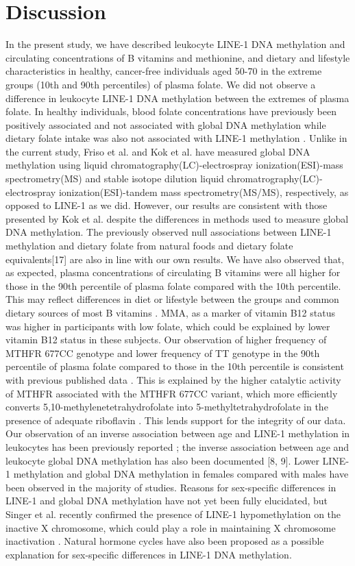 \section{Discussion} %
In the present study, we have described leukocyte LINE-1 DNA methylation and circulating concentrations of B vitamins and methionine, and dietary and lifestyle characteristics in healthy, cancer-free individuals aged 50-70 in the extreme groups (10th and 90th percentiles) of plasma folate. We did not observe a difference in leukocyte LINE-1 DNA methylation between the extremes of plasma folate. In healthy individuals, blood folate concentrations have previously been positively associated \cite{c318} and not associated with global DNA methylation \cite{c319} while dietary folate intake was also not associated with LINE-1 methylation \cite{c317}. Unlike in the current study, Friso et al. \cite{c318} and Kok et al. \cite{c319} have measured global DNA methylation using liquid chromatography(LC)-electrospray ionization(ESI)-mass spectrometry(MS) and stable isotope dilution liquid chromatrography(LC)-electrospray ionization(ESI)-tandem mass spectrometry(MS/MS), respectively, as opposed to LINE-1 as we did. 
However, our results are consistent with those presented by Kok et al. despite the differences in methods used to measure global DNA methylation. The previously observed null associations between LINE-1 methylation and dietary folate from natural foods and dietary folate equivalents[17] are also in line with our own results. 
We have also observed that, as expected, plasma concentrations of circulating B vitamins were all higher for those in the 90th percentile of plasma folate compared with the 10th percentile. This may reflect differences in diet or lifestyle between the groups and common dietary sources of most B vitamins \cite{c329}. MMA, as a marker of vitamin B12 status \cite{c330} was higher in participants with low folate, which could be explained by lower vitamin B12 status in these subjects. Our observation of higher frequency of MTHFR 677CC genotype and lower frequency of TT genotype in the 90th percentile of plasma folate compared to those in the 10th percentile is consistent with previous published data \cite{c318}. This is explained by the higher catalytic activity of MTHFR associated with the MTHFR 677CC variant, which more efficiently converts 5,10-methylenetetrahydrofolate into 5-methyltetrahydrofolate in the presence of adequate riboflavin \cite{c318}. This lends support for the integrity of our data. 
Our observation of an inverse association between age and LINE-1 methylation in leukocytes has been previously reported \cite{c37}; the inverse association between age and leukocyte global DNA methylation has also been documented [8, 9]. Lower LINE-1 methylation \cite{c310,c312} and global DNA methylation \cite{c39} in females compared with males have been observed in the majority of studies. Reasons for sex-specific differences in LINE-1 and global DNA methylation have not yet been fully elucidated, but Singer et al. recently confirmed the presence of LINE-1 hypomethylation on the inactive X chromosome, which could play a role in maintaining X chromosome inactivation \cite{c331}. Natural hormone cycles \cite{c332} have also been proposed as a possible explanation for sex-specific differences in LINE-1 DNA methylation. 
